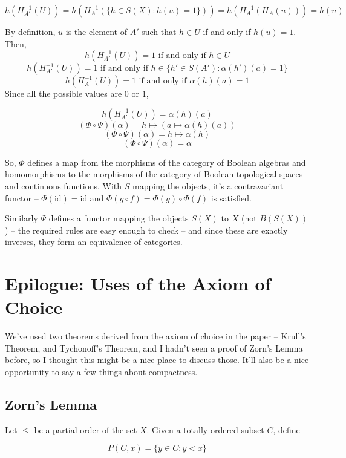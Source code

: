 \documentclass{article}
\begin{document}
      \[ h ( H_{A'}^{-1} (U)) =  h(H_A^{-1}(\{h \in S(X) : h(u) = 1\})) =
      h(H_A^{-1}(H_A(u))) =
      h(u)\]

      By definition, $u$ is the element of $A'$ such that $h \in U$ if and only if
      $h(u) = 1$. Then,
      \[ h ( H_{A'}^{-1} (U)) = 1 \text{ if and only if } h \in U\]
      \[ h ( H_{A'}^{-1} (U)) = 1 \text{ if and only if } h \in \{h' \in S(A') :
      \alpha(h')(a) = 1\} \]
      \[ h ( H_{A'}^{-1} (U)) = 1 \text{ if and only if } \alpha(h)(a) = 1\]
      Since all the possible values are $0$ or $1$,

      \[ h ( H_{A'}^{-1} (U)) = \alpha(h)(a)\]
      \[(\Phi \circ \Psi)(\alpha) = h \mapsto (a \mapsto \alpha(h)(a))\]
      \[(\Phi \circ \Psi)(\alpha) =  h \mapsto \alpha(h)\]
      \[(\Phi \circ \Psi)(\alpha) = \alpha\]

      So, $\Phi$ defines a map from the morphisms of the category of Boolean
      algebras and homomorphisms to the morphisms of the category of Boolean
      topological spaces and continuous functions. With $S$ mapping the objects,
      it's a contravariant functor -- $\Phi(\text{id}) = \text{id}$ and $\Phi(g \circ f) =
      \Phi(g) \circ \Phi(f)$ is satisfied.

      Similarly $\Psi$ defines a functor mapping the objects $S(X)$ to $X$ (not
      $B(S(X))$) -- the required rules are easy enough to check -- and since
      these are exactly inverses, they form an equivalence of categories.

    \section{Epilogue: Uses of the Axiom of Choice}

      We've used two theorems derived from the axiom of choice in the paper --
      Krull's Theorem, and Tychonoff's Theorem, and I hadn't seen a proof of
      Zorn's Lemma before, so I thought this might be a nice place to discuss
      those. It'll also be a nice opportunity to say a few things about
      compactness.

      \subsection{Zorn's Lemma}

        Let $\leq$ be a partial order of the set $X$. Given a totally ordered
        subset $C$, define

        \[P(C,x) = \{y \in C: y < x\}\]
\end{document}
